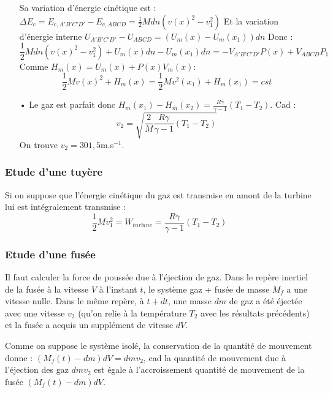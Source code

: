 \documentclass{report}
\begin{document}
\begin{itemize}
Sa variation d'énergie cinétique est :
 $\Delta E_c =  E_{c,A'B'C'D'} - E_{c,ABCD} = \frac{1}{2}Mdn\left(v(x)^2-v_1^2\right) $
Et la variation d'énergie interne $U_{A'B'C'D'} - U_{ABCD}=(U_m(x) - U_m(x_1))dn$
Donc : 
	\begin{equation}
	\frac{1}{2}Mdn\left(v(x)^2-v_1^2\right) + U_m(x)dn - U_m(x_1)dn = -V_{A'B'C'D'}P(x)+V_{ABCD}P_1
\end{equation}
Comme $H_m(x) = U_m(x)+P(x)V_m(x)$:
	\begin{equation}
	\frac{1}{2}M v(x)^2+ H_m(x)  =\frac{1}{2}M v^2(x_1) + H_m(x_1) = cst
\end{equation}
\item[•] Le gaz est parfait donc $H_m(x_1)-H_m(x_2)=\frac{R\gamma}{\gamma-1}(T_1-T_2)$. Cad : 
\begin{equation}
	v_2=\sqrt{\frac{2}{M}\frac{R\gamma}{\gamma-1}(T_1-T_2)}
\end{equation}
On trouve $v_2=301,5$m.s$^{-1}$.

\end{itemize}

\subsubsection*{Etude d'une tuyère}
Si on suppose que l'énergie cinétique du gaz est transmise en amont de la turbine lui est intégralement transmise :
\begin{equation}
	\frac{1}{2}Mv_1^2=W_{turbine} = \frac{R\gamma}{\gamma-1}(T_1-T_2)
\end{equation}

\subsubsection*{Etude d'une fusée}
Il faut calculer la force de poussée due à l'éjection de gaz. Dans le repère inertiel de la fusée à la vitesse $V$ à l'instant $t$, le système {gaz + fusée} de masse $M_f$ a une vitesse nulle. Dans le même repère, à $t+dt$, une masse $dm$ de gaz a été éjectée avec une vitesse $v_2$ (qu'on relie à la température $T_2$ avec les résultats précédents) et la fusée a acquis un supplément de vitesse $dV$.

Comme on suppose le système isolé, la conservation de la quantité de mouvement donne : $(M_f(t) - dm)dV = dmv_2$, cad la quantité de mouvement due à l'éjection des gaz $dmv_2$ est égale à l'accroissement quantité de mouvement de la fusée $(M_f(t) - dm)dV$.

\noindent{}
\end{document}
